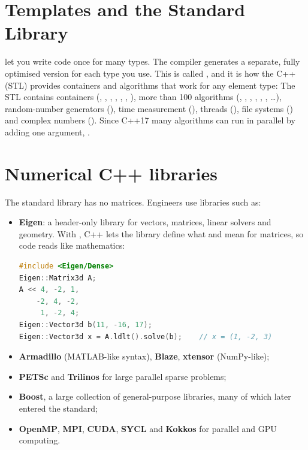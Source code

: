 \section{Templates and the Standard Library}

 let you write code once for many types. The compiler generates a separate,
fully optimised version for each type you use. This is called ,
and it is how the C++  (STL) provides containers and
algorithms that work for any element type:
The STL contains containers (, , ,
, , , ), more than 100 algorithms
(, , , , ,
, \ldots), random-number generators (), time
measurement (), threads (), file systems
() and complex numbers (). Since C++17 many algorithms
can run in parallel by adding one argument, .

\section{Numerical C++ libraries}

The standard library has no matrices. Engineers use libraries such as:
\begin{itemize}
\item \textbf{Eigen}: a header-only library for vectors, matrices, linear solvers and
  geometry. With , C++ lets the library define what \code{+}
  and \code{*} mean for matrices, so code reads like mathematics:
\begin{lstlisting}[language=C++]
#include <Eigen/Dense>
Eigen::Matrix3d A;
A << 4, -2, 1,
    -2, 4, -2,
     1, -2, 4;
Eigen::Vector3d b(11, -16, 17);
Eigen::Vector3d x = A.ldlt().solve(b);    // x = (1, -2, 3)
\end{lstlisting}
\item \textbf{Armadillo} (MATLAB-like syntax), \textbf{Blaze}, \textbf{xtensor} (NumPy-like);
\item \textbf{PETSc} and \textbf{Trilinos} for large parallel sparse problems;
\item \textbf{Boost}, a large collection of general-purpose libraries, many of which later
  entered the standard;
\item \textbf{OpenMP}, \textbf{MPI}, \textbf{CUDA}, \textbf{SYCL} and \textbf{Kokkos} for
  parallel and GPU computing.
\end{itemize}

